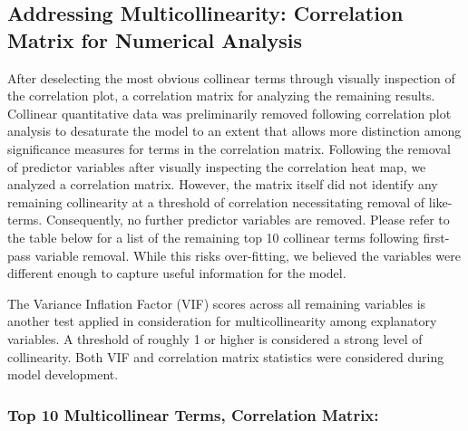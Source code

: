 \documentclass[american,]{article}
\begin{document}
\hypertarget{addressing-multicollinearity-correlation-matrix-for-numerical-analysis}{%
\subsection{\texorpdfstring{\textbf{Addressing Multicollinearity: Correlation Matrix for Numerical Analysis}}{Addressing Multicollinearity: Correlation Matrix for Numerical Analysis}}\label{addressing-multicollinearity-correlation-matrix-for-numerical-analysis}}

After deselecting the most obvious collinear terms through visually inspection of the correlation plot, a correlation matrix for analyzing the remaining results. Collinear quantitative data was preliminarily removed following correlation plot analysis to desaturate the model to an extent that allows more distinction among significance measures for terms in the correlation matrix. Following the removal of predictor variables after visually inspecting the correlation heat map, we analyzed a correlation matrix. However, the matrix itself did not identify any remaining collinearity at a threshold of correlation necessitating removal of like-terms. Consequently, no further predictor variables are removed. Please refer to the table below for a list of the remaining top 10 collinear terms following first-pass variable removal. While this risks over-fitting, we believed the variables were different enough to capture useful information for the model.

The Variance Inflation Factor (VIF) scores across all remaining variables is another test applied in consideration for multicollinearity among explanatory variables. A threshold of roughly 1 or higher is considered a strong level of collinearity. Both VIF and correlation matrix statistics were considered during model development.

\hypertarget{top-10-multicollinear-terms-correlation-matrix}{%
\subsubsection{\texorpdfstring{\textbf{Top 10 Multicollinear Terms, Correlation Matrix:}}{Top 10 Multicollinear Terms, Correlation Matrix:}}\label{top-10-multicollinear-terms-correlation-matrix}}
\end{document}
